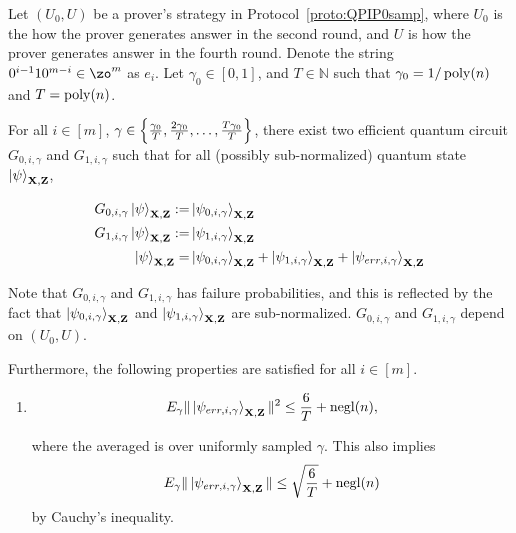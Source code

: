 \begin{lemma}\label{lem:partition2}
Let $(U_0,U)$ be a prover's strategy in Protocol~\ref{proto:QPIP0samp}, where $U_0$ is the how the prover generates answer in the second round, and $U$ is how the prover generates answer in the fourth round. Denote the string $0^{i-1}10^{m-i} \in \zo^m $ as $e_i$.  Let $\gamma_0 \in[0,1]$, and $T\in \mathbb{N}$ such that $\gamma_0=1/\operatorname*{\operatorname{poly}}(n)$ and $T=\operatorname*{\operatorname{poly}}(n)$.

 For all $i\in[m]$, $\gamma \in \left\{\frac{\gamma_0}{T},\frac{2\gamma_0}{T},\dots,\frac{T\gamma_0}{T}\right\}$, there exist two efficient quantum circuit $G_{0,i,\gamma}$ and $G_{1,i,\gamma}$ such that for all (possibly sub-normalized)  quantum state $\ket{\psi}_{\mathbf{X},\mathbf{Z}}$,  

\begin{align}
    G_{0,i,\gamma}\ket{\psi}_{\mathbf{X},\mathbf{Z}} :=& \ket{\psi_{0,i,\gamma}}_{\mathbf{X},\mathbf{Z}} \\ G_{1,i,\gamma}\ket{\psi}_{\mathbf{X},\mathbf{Z}} :=& \ket{\psi_{1,i,\gamma}}_{\mathbf{X},\mathbf{Z}}  \\
    \ket{\psi}_{\mathbf{X},\mathbf{Z}} =&   \ket{\psi_{0,i,\gamma}}_{\mathbf{X},\mathbf{Z}}+ \ket{\psi_{1,i,\gamma}}_{\mathbf{X},\mathbf{Z}}+\ket{\psi_{err,i,\gamma}}_{\mathbf{X},\mathbf{Z}}
\end{align}


 

 
  Note that $G_{0,i,\gamma}$ and $G_{1,i,\gamma}$ has failure probabilities, and this is reflected by the fact that $\ket{\psi_{0,i,\gamma}}_{\mathbf{X},\mathbf{Z}}$ and $\ket{\psi_{1,i,\gamma}}_{\mathbf{X},\mathbf{Z}}$ are  sub-normalized. $G_{0,i,\gamma}$ and $G_{1,i,\gamma}$ depend on $(U_0,U)$.

 


Furthermore, the following properties are satisfied for all $i\in[m]$.
%
\begin{enumerate}
    \item \label{property:partition-err}  $$E_{\gamma}\|\ket{\psi_{err,i,\gamma}}_{\mathbf{X},\mathbf{Z}}\|^2 \leq \frac{6}{T}+\operatorname{negl}(n),$$
    
    where the averaged is over uniformly sampled $\gamma$. This also implies
    \begin{align}
        E_{\gamma}\|\ket{\psi_{err,i,\gamma}}_{\mathbf{X},\mathbf{Z}}\| \leq \sqrt{\frac{6}{T}}+\operatorname{negl}(n)
    \end{align}
by Cauchy's inequality.
    

\end{enumerate}
\end{lemma}
